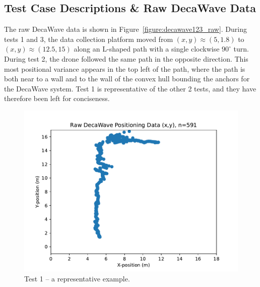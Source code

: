 \subsection{Test Case Descriptions \& Raw DecaWave Data}

The raw DecaWave data is shown in Figure~\ref{figure:decawave123_raw}.
During tests 1 and 3, the data collection platform moved from $(x,y)\approx(5,1.8)$
to $(x,y)\approx(12.5,15)$ along an L-shaped path with a single clockwise $90^\circ$ turn.
During test 2, the drone followed the same path in the opposite direction.
This most positional variance appears in the top left of the path, where the path is both
near to a wall and to the wall of the convex hull bounding the anchors for the DecaWave system.
Test 1 is representative of the other 2 tests, and they have therefore been left for conciseness.

\begin{figure}[h]
     \centering
         \includegraphics[width=\linewidth]{./images/test1_decawave.pdf}
         \caption{Test 1 -- a representative example.}
         \label{figure:test1_decawave}
\end{figure}

